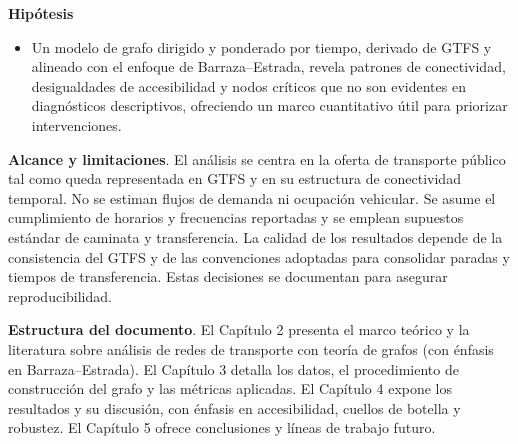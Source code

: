     \textbf{Hipótesis}
    \begin{itemize}
      \item Un modelo de grafo dirigido y ponderado por tiempo, derivado de GTFS y alineado con el enfoque de Barraza–Estrada, revela patrones de conectividad, desigualdades de accesibilidad y nodos críticos que no son evidentes en diagnósticos descriptivos, ofreciendo un marco cuantitativo útil para priorizar intervenciones.
    \end{itemize}

    \textbf{Alcance y limitaciones}. El análisis se centra en la oferta de transporte público tal como queda representada en GTFS y en su estructura de conectividad temporal. No se estiman flujos de demanda ni ocupación vehicular. Se asume el cumplimiento de horarios y frecuencias reportadas y se emplean supuestos estándar de caminata y transferencia. La calidad de los resultados depende de la consistencia del GTFS y de las convenciones adoptadas para consolidar paradas y tiempos de transferencia. Estas decisiones se documentan para asegurar reproducibilidad.

    \textbf{Estructura del documento}. El Capítulo 2 presenta el marco teórico y la literatura sobre análisis de redes de transporte con teoría de grafos (con énfasis en Barraza–Estrada). El Capítulo 3 detalla los datos, el procedimiento de construcción del grafo y las métricas aplicadas. El Capítulo 4 expone los resultados y su discusión, con énfasis en accesibilidad, cuellos de botella y robustez. El Capítulo 5 ofrece conclusiones y líneas de trabajo futuro.
